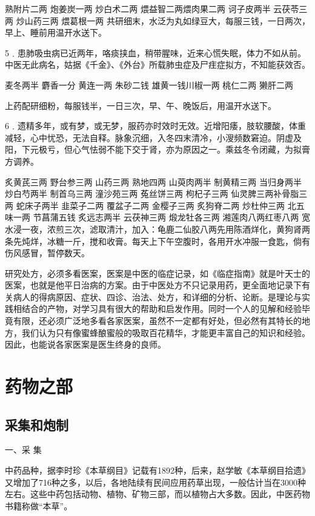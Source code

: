 \documentclass[12pt,UTF8]{ctexbook}
\begin{document}
熟附片二两 炮姜炭一两 炒白术二两 煨益智二两煨肉果二两 诃子皮两半 云茯苓三两 炒山药三两 煨葛根一两
共研细末，水泛为丸如绿豆大，每服三钱，一日两次，早上、睡前用温开水送下。

5﹒患肺吸虫病已近两年，咯痰挟血，稍带腥味，近来心慌失眠，体力不如从前。中医无此病名，姑据《千金》、《外台》所载肺虫症及尸疰症拟方，不知能获效否。

麦冬两半 麝香一分 黄连一两 朱砂二钱 雄黄一钱川椒一两 桃仁二两 獭肝二两

上药配研细粉，每服钱半，一日三次，早、午、晚饭后，用温开水送下。

6﹒遗精多年，或有梦，或无梦，服药亦时效时无效。近增阳痿，肢软腰酸，体重减轻，心中忧恐，无法自释。脉象沉细，入冬四末清冷，小溲频数窘迫。阴虚及阳，下元极亏，但心气怯弱不能下交于肾，亦为原因之一。乘兹冬令闭藏，为拟膏方调养。

炙黄芪三两 野台参三两 山药三两 熟地四两 山萸肉两半 制黄精三两 当归身两半 炒白芍两半 制首乌三两 潼沙苑三两 菟丝饼三两 枸杞子三两 仙灵脾三两补骨脂三两 蛇床子两半 韭菜子二两 覆盆子二两 金樱子三两 炙狗脊二两 炒杜仲三两 北五味一两 节菖蒲五钱 炙远志两半 云茯神三两 煅龙牡各三两 湘莲肉八两红枣八两
宽水浸一夜，浓煎三次，滤取清汁，加入：龟鹿二仙胶八两先用陈酒烊化，黄狗肾两条先炖烊，冰糖一斤，搅和收膏。每天上下午空腹时，各用开水冲服一食匙，倘有伤风感冒，暂停数天。

研究处方，必须多看医案，医案是中医的临症记录，如《临症指南》就是叶天士的医案，也就是他平日治病的方案。由于中医处方不只记录用药，更全面地记录下有关病人的得病原因、症状、四诊、治法、处方，和详细的分析、论断。是理论与实践相结合的产物，对学习具有很大的帮助和启发作用。同时一个人的见解和经验毕竟有限，还必须广泛地多看各家医案，虽然不一定都有好处，但必然有其特长的地方，我们认为只有像蜜蜂酿蜜般的吸取百花精华，才能更丰富自己的知识和经验。因此，也能说各家医案是医生终身的良师。

\chapter{药物之部}

\section{采集和炮制}

一、采 集

中药品种，据李时珍《本草纲目》记载有1892种，后来，赵学敏《本草纲目拾遗》又增加了716种之多，以后，各地陆续有民间应用药草出现，一般估计当在3000种左右。这些中药包括动物、植物、矿物三部，而以植物占大多数。因此，中医药物书籍称做“本草”。
\end{document}
